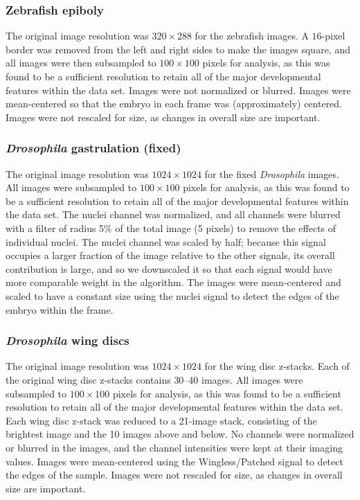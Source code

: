 \subsubsection{Zebrafish epiboly}

The original image resolution was $320 \times 288$ for the zebrafish images.
%
A $16$-pixel border was removed from the left and right sides to make the images square, and all images were then subsampled to $100 \times 100$ pixels for analysis, as this was found to be a sufficient resolution to retain all of the major developmental features within the data set. 
%
Images were not normalized or blurred.
%
Images were mean-centered so that the embryo in each frame was (approximately) centered. 
%
Images were not rescaled for size, as changes in overall size are important. 

\subsubsection{{\em Drosophila} gastrulation (fixed)}

The original image resolution was $1024 \times 1024$ for the fixed {\em Drosophila} images.
%
All images were subsampled to $100 \times 100$ pixels for analysis, as this was found to be a sufficient resolution to retain all of the major developmental features within the data set. 
%
The nuclei channel was normalized, and all channels were blurred with a filter of radius 5\% of the total image (5 pixels) to remove the effects of individual nuclei. 
%
The nuclei channel was scaled by half; because this signal occupies a larger fraction of the image relative to the other signals, its overall contribution is large, and so we downscaled it so that each signal would have more comparable weight in the algorithm. 
%
The images were mean-centered and scaled to have a constant size using the nuclei signal to detect the edges of the embryo within the frame.



\subsubsection{{\em Drosophila} wing discs}

The original image resolution was $1024 \times 1024$ for the wing disc z-stacks.
%
Each of the original wing disc z-stacks contains 30--40 images. 
%
All images were subsampled to $100 \times 100$ pixels for analysis, as this was found to be a sufficient resolution to retain all of the major developmental features within the data set. 
%
Each wing disc z-stack was reduced to a 21-image stack, consisting of the brightest image and the 10 images above and below.
%
No channels were normalized or blurred in the images, and the channel intensities were kept at their imaging values. 
%
Images were mean-centered using the Wingless/Patched signal to detect the edges of the sample. 
%
Images were not rescaled for size, as changes in overall size are important. 

